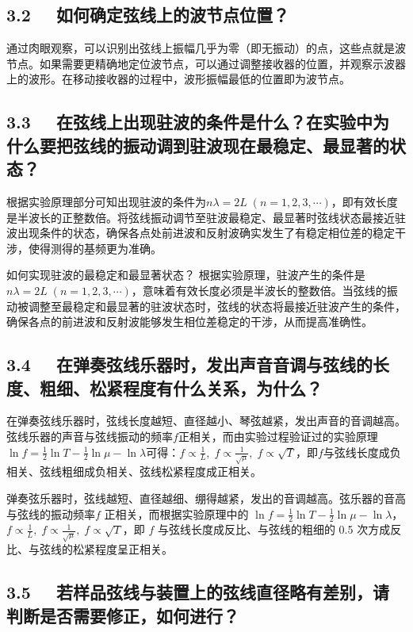 \documentclass[UTF8]{article}
\theoremstyle{MyLineTheoremStyle} %
\theoremstyle{MyBlockTheoremStyle} %
\theoremstyle{MySubsubsectionStyle} %
\begin{document}
\subsection*{3.2 \ \  如何确定弦线上的波节点位置？}
通过肉眼观察，可以识别出弦线上振幅几乎为零（即无振动）的点，这些点就是波节点。如果需要更精确地定位波节点，可以通过调整接收器的位置，并观察示波器上的波形。在移动接收器的过程中，波形振幅最低的位置即为波节点。

\subsection*{3.3 \ \  在弦线上出现驻波的条件是什么？在实验中为什么要把弦线的振动调到驻波现在最稳定、最显著的状态？}
根据实验原理部分可知出现驻波的条件为$ n\lambda = 2L\;(n=1,2,3,\cdots) $，即有效长度是半波长的正整数倍。将弦线振动调节至驻波最稳定、最显著时弦线状态最接近驻波出现条件的状态，确保各点处前进波和反射波确实发生了有稳定相位差的稳定干涉，使得测得的基频更为准确。

如何实现驻波的最稳定和最显著状态？
根据实验原理，驻波产生的条件是 $ n\lambda = 2L\;(n=1,2,3,\cdots) $，意味着有效长度必须是半波长的整数倍。当弦线的振动被调整至最稳定和最显著的驻波状态时，弦线的状态将最接近驻波产生的条件，确保各点的前进波和反射波能够发生相位差稳定的干涉，从而提高准确性。

\subsection*{3.4 \ \ 在弹奏弦线乐器时，发出声音音调与弦线的长度、粗细、松紧程度有什么关系，为什么？}

在弹奏弦线乐器时，弦线长度越短、直径越小、琴弦越紧，发出声音的音调越高。弦线乐器的声音与弦线振动的频率$ f $正相关，而由实验过程验证过的实验原理$ \ln f=\frac12\ln T-\frac12\ln\mu-\ln\lambda $可得：$ f\propto\frac1L,\;f\propto\frac{1}{\sqrt\mu},\;f\propto\sqrt T $，即$ f $与弦线长度成负相关、弦线粗细成负相关、弦线松紧程度成正相关。

弹奏弦乐器时，弦线越短、直径越细、绷得越紧，发出的音调越高。弦乐器的音高与弦线的振动频率$ f $ 正相关，而根据实验原理中的 $ \ln f=\frac12\ln T-\frac12\ln\mu-\ln\lambda $，$ f\propto\frac1L,\;f\propto\frac{1}{\sqrt\mu},\;f\propto\sqrt T $，即 $ f $ 与弦线长度成反比、与弦线的粗细的 0.5 次方成反比、与弦线的松紧程度呈正相关。

\subsection*{3.5 \ \  若样品弦线与装置上的弦线直径略有差别，请判断是否需要修正，如何进行？}
\end{document}
